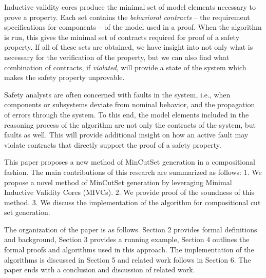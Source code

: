 Inductive validity cores produce the minimal set of model elements necessary to prove a property. Each set contains the \emph{behavioral contracts} -- the requirement specifications for components -- of the model used in a proof. When the \aivcalg algorithm is run, this gives the minimal set of contracts required for proof of a safety property. If all of these sets are obtained, we have insight into not only what is necessary for the verification of the property, but we can also find what combination of contracts, if \emph{violated}, will provide a state of the system which makes the safety property unprovable. 

Safety analysts are often concerned with faults in the system, i.e., when components or subsystems deviate from nominal behavior, and the propagation of errors through the system. To this end, the model elements included in the reasoning process of the \aivcalg algorithm are not only the contracts of the system, but faults as well. This will provide additional insight on how an active fault may violate contracts that directly support the proof of a safety property. 

This paper proposes a new method of MinCutSet generation in a compositional fashion. The main contributions of this research are summarized as follows: 1. We propose a novel method of MinCutSet generation by leveraging Minimal Inductive Validity Cores (MIVCs). %
2. We provide proof of the soundness of this method. 3. We discuss the implementation of the algorithm for compositional cut set generation.

The organization of the paper is as follows. Section 2 provides formal definitions and background, Section 3 provides a running example, Section 4 outlines the formal proofs and algorithms used in this approach. The implementation of the algorithms is discussed in Section 5 and related work follows in Section 6. The paper ends with a conclusion and discussion of related work.
